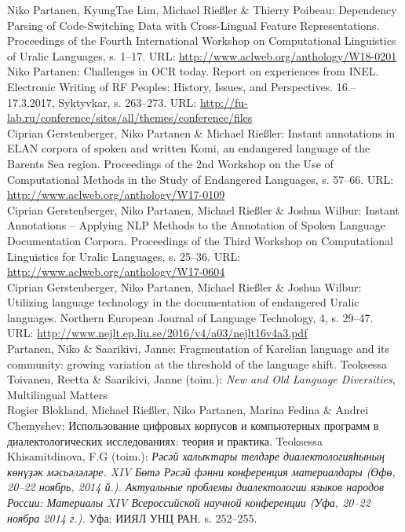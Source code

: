 \documentclass[11pt, a4paper]{article}
\newcommand{\years}[1]{\marginnote{\scriptsize #1}} %
\begin{document}
\years{2018} Niko Partanen, KyungTae Lim, Michael Rießler \& Thierry Poibeau: Dependency Parsing of Code-Switching Data with Cross-Lingual Feature Representations. Proceedings of the Fourth International Workshop on Computational Linguistics of Uralic Languages, s. 1--17. URL: \url{http://www.aclweb.org/anthology/W18-0201}\\

\years{2017} Niko Partanen: Challenges in OCR today. Report on experiences from INEL. Electronic Writing of RF Peoples: History, Issues, and Perspectives. 16.--17.3.2017, Syktyvkar, s. 263--273. URL: \url{http://fu-lab.ru/conference/sites/all/themes/conference/files}\\

\years{2017} Ciprian Gerstenberger, Niko Partanen \& Michael Rießler: Instant annotations in ELAN corpora of spoken and written Komi, an endangered language of the Barents Sea region. Proceedings of the 2nd Workshop on the Use of Computational Methods in the Study of Endangered Languages, s. 57--66. URL: \url{http://www.aclweb.org/anthology/W17-0109}\\

\years{2017} Ciprian Gerstenberger, Niko Partanen, Michael Rießler \& Joshua Wilbur: Instant Annotations -- Applying NLP Methods to the Annotation of Spoken Language Documentation Corpora. Proceedings of the Third Workshop on Computational Linguistics for Uralic Languages, s. 25--36. URL: \url{http://www.aclweb.org/anthology/W17-0604}\\

\years{2016} Ciprian Gerstenberger, Niko Partanen, Michael Rießler \& Joshua Wilbur: Utilizing language technology in the documentation of endangered Uralic languages. Northern European Journal of Language Technology, 4, s. 29--47. URL: \url{http://www.nejlt.ep.liu.se/2016/v4/a03/nejlt16v4a3.pdf} \\

\years{2016} Partanen, Niko \& Saarikivi, Janne: Fragmentation of Karelian language and its community: growing variation at the threshold of the language shift. Teoksessa Toivanen, Reetta \& Saarikivi, Janne (toim.): \emph{New and Old Language Diversities}, Multilingual Matters\\

\years{2014} Rogier Blokland, Michael Rießler, Niko Partanen, Marina Fedina \& Andrei Chemyshev: Использование цифровых корпусов и компьютерных программ в диалектологических исследованиях: теория и практика. Teoksessa Khisamitdinova, F.G (toim.): \emph{Рәсәй халыҡтары телдәре диалектологияһының көнүҙәк мәсьәләләре. XIV Бөтә Рәсәй фәнни конференция материалдары (Өфө, 20--22 ноябрь, 2014 й.). Актуальные проблемы диалектологии языков народов России: Материалы XIV Всероссийской научной конференции (Уфа, 20--22 ноябра 2014 г.).} Уфа: ИИЯЛ УНЦ РАН. s. 252--255.\\
\end{document}
